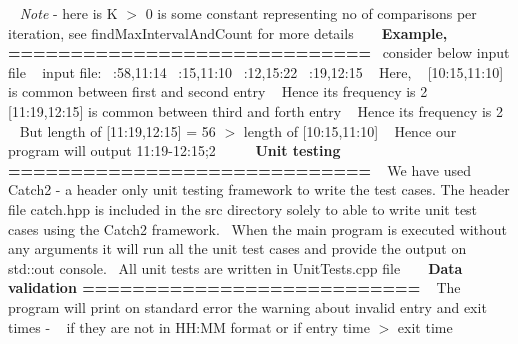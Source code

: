~\newline
{\itshape Note} -\/ here is K \texorpdfstring{$>$}{>} 0 is some constant representing no of comparisons per iteration, see find\+Max\+Interval\+And\+Count for more details ~\newline
~\newline
{\bfseries{Example, =============================}}~\newline
consider below input file ~\newline
input file\+: ~\+:58,11\+:14 ~\+:15,11\+:10 ~\+:12,15\+:22 ~\+:19,12\+:15 ~\newline
 Here, ~\newline
\mbox{[}10\+:15,11\+:10\mbox{]} is common between first and second entry ~\newline
Hence its frequency is 2 ~\newline
\mbox{[}11\+:19,12\+:15\mbox{]} is common between third and forth entry ~\newline
Hence its frequency is 2 ~\newline
But length of \mbox{[}11\+:19,12\+:15\mbox{]} = 56 \texorpdfstring{$>$}{>} length of \mbox{[}10\+:15,11\+:10\mbox{]} ~\newline
Hence our program will output 11\+:19-\/12\+:15;2 ~\newline
~\newline
~\newline
{\bfseries{Unit testing =============================}} ~\newline
We have used Catch2 -\/ a header only unit testing framework to write the test cases. The header file catch.\+hpp is included in the src directory solely to able to write unit test cases using the Catch2 framework.~\newline
When the main program is executed without any arguments it will run all the unit test cases and provide the output on std\+::out console.~\newline
All unit tests are written in Unit\+Tests.\+cpp file ~\newline
~\newline
{\bfseries{Data validation ===========================}} ~\newline
The program will print on standard error the warning about invalid entry and exit times -\/ ~\newline
if they are not in HH\+:MM format or if entry time \texorpdfstring{$>$}{>} exit time 